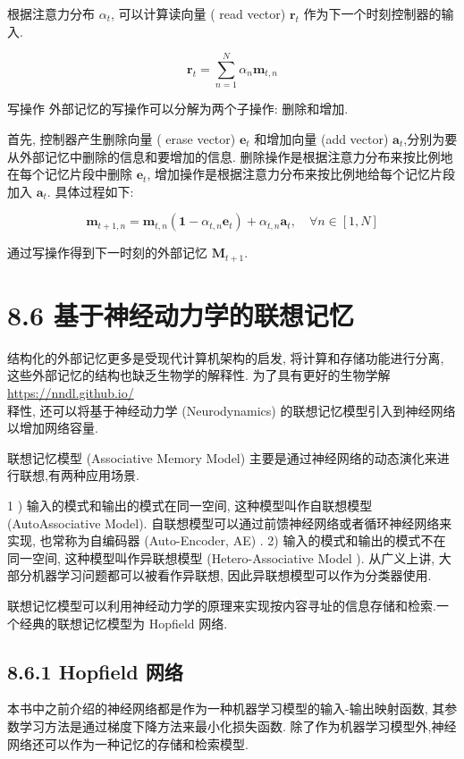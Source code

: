 \documentclass[10pt]{article}
\begin{document}
根据注意力分布 $\alpha_{t}$, 可以计算读向量 ( read vector) $\boldsymbol{r}_{t}$ 作为下一个时刻控制器的输入.


\begin{equation*}
\boldsymbol{r}_{t}=\sum_{n=1}^{N} \alpha_{n} \boldsymbol{m}_{t, n} \tag{8.30}
\end{equation*}


写操作 外部记忆的写操作可以分解为两个子操作: 删除和增加.

首先, 控制器产生删除向量 ( erase vector) $\boldsymbol{e}_{t}$ 和增加向量 (add vector) $\boldsymbol{a}_{t}$,分别为要从外部记忆中删除的信息和要增加的信息. 删除操作是根据注意力分布来按比例地在每个记忆片段中删除 $\boldsymbol{e}_{t}$, 增加操作是根据注意力分布来按比例地给每个记忆片段加入 $\boldsymbol{a}_{t}$. 具体过程如下:


\begin{equation*}
\boldsymbol{m}_{t+1, n}=\boldsymbol{m}_{t, n}\left(\mathbf{1}-\alpha_{t, n} \boldsymbol{e}_{t}\right)+\alpha_{t, n} \boldsymbol{a}_{t}, \quad \forall n \in[1, N] \tag{8.31}
\end{equation*}


通过写操作得到下一时刻的外部记忆 $\boldsymbol{M}_{t+1}$.

\section*{8.6 基于神经动力学的联想记忆}
结构化的外部记忆更多是受现代计算机架构的启发, 将计算和存储功能进行分离, 这些外部记忆的结构也缺乏生物学的解释性. 为了具有更好的生物学解 \href{https://nndl.github.io/}{https://nndl.github.io/}\\
释性, 还可以将基于神经动力学 (Neurodynamics) 的联想记忆模型引入到神经网络以增加网络容量.

联想记忆模型 (Associative Memory Model) 主要是通过神经网络的动态演化来进行联想,有两种应用场景.

1 ) 输入的模式和输出的模式在同一空间, 这种模型叫作自联想模型 (AutoAssociative Model). 自联想模型可以通过前馈神经网络或者循环神经网络来实现, 也常称为自编码器 (Auto-Encoder, AE) . 2) 输入的模式和输出的模式不在同一空间, 这种模型叫作异联想模型 (Hetero-Associative Model ). 从广义上讲, 大部分机器学习问题都可以被看作异联想, 因此异联想模型可以作为分类器使用.

联想记忆模型可以利用神经动力学的原理来实现按内容寻址的信息存储和检索.一个经典的联想记忆模型为 Hopfield 网络.

\subsection*{8.6.1 Hopfield 网络}
本书中之前介绍的神经网络都是作为一种机器学习模型的输入-输出映射函数, 其参数学习方法是通过梯度下降方法来最小化损失函数. 除了作为机器学习模型外,神经网络还可以作为一种记忆的存储和检索模型.
\end{document}
